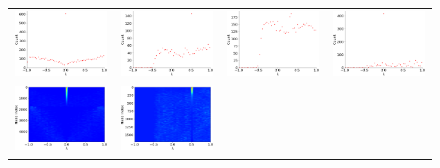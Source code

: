 \documentclass[senior,final,11pt]{iscs-thesis}
\begin{document}
\begin{figure}[htbp]
  \setlength\tabcolsep{0pt}
  \hspace{-3.0cm}
  \begin{tabular}{cccc}
    \includegraphics[width=45mm]{figure/power-US-Gridmtx_dos.png} &
    \includegraphics[width=45mm]{figure/power-bcspwr09mtx_dos.png} &
    \includegraphics[width=45mm]{figure/power-bcspwr10mtx_dos.png} &
    \includegraphics[width=45mm]{figure/power-eris1176mtx_dos.png} \\
    \includegraphics[width=45mm]{figure/power-US-Gridmtx_pdos.png} &
    \includegraphics[width=45mm]{figure/power-bcspwr09mtx_pdos.png} &

\end{tabular}
\end{figure}
\end{document}
